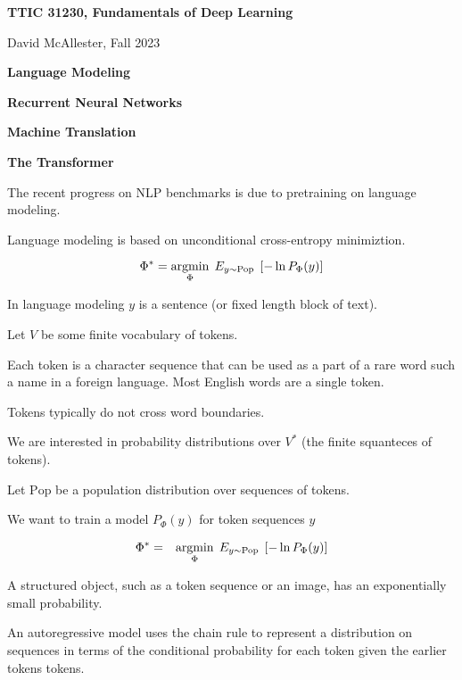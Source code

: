 




{\Huge

  \centerline{\bf TTIC 31230, Fundamentals of Deep Learning}
  \bigskip
  \centerline{David McAllester, Fall 2023}
  \vfill
  \vfill
  \centerline{\bf Language Modeling}
  \vfill
  \centerline{\bf Recurrent Neural Networks}
  \vfill
  \centerline{\bf Machine Translation}
  \vfill
  \centerline{\bf The Transformer}
  \vfill
  \vfill


The recent progress on NLP benchmarks is due to pretraining on language modeling.

\vfill
Language modeling is based on unconditional cross-entropy minimiztion.

\vfill
$$\Phi^* = \operatorname*{argmin}_\Phi \;E_{y \sim \mathrm{Pop}}\;\left[-\ln P_\Phi(y)\right]$$

\vfill
In language modeling $y$ is a sentence (or fixed length block of text).


Let $V$ be some finite vocabulary of tokens.

\vfill
Each token is a character sequence that
can be used as a part of a rare word such a name in a foreign language.  Most English words
are a single token.

\vfill
Tokens typically do not cross word boundaries.

\vfill
We are interested in probability distributions over $V^*$ (the finite squanteces of tokens).


Let $\mathrm{Pop}$ be a population distribution over sequences of tokens.

\vfill
We want to train a model $P_\Phi(y)$ for token sequences $y$

\begin{eqnarray*}
\Phi^* & = & \operatorname*{argmin}_\Phi \; E_{y \sim \mathrm{Pop}}\;\left[-\ln P_\Phi(y)\right]
\end{eqnarray*}

A structured object, such as a token sequence or an image, has an exponentially small probability.


An autoregressive model uses the chain rule to represent a distribution on sequences in terms of the conditional probability for each token given  the earlier tokens
tokens.

}
